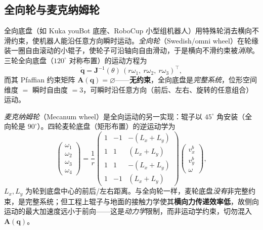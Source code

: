 \subsection{全向轮与麦克纳姆轮}
\label{sec:mw-omni}

全向底盘（如 Kuka youBot 底座、RoboCup 小型组机器人）用特殊轮消去横向不滑约束，使机器人能沿任意方向瞬时运动。\emph{全向轮}（Swedish/omni wheel）在轮缘装一圈自由滚动的小辊子，使轮子可沿轴向自由滑动，于是横向不滑约束被\emph{消除}。三轮全向底盘（$120^\circ$ 对称布置）的运动方程为
\begin{equation}
  \dot{\mathbf{q}}=\mathbf{J}^{-1}(\theta)\,(r\omega_1,\ r\omega_2,\ r\omega_3)^\top,
  \label{eq:mw-omni-fk}
\end{equation}
而其 Pfaffian 约束矩阵 $\mathbf{A}(\mathbf{q})=\varnothing$——\textbf{无约束}，全向底盘是\emph{完整系统}，位形空间维度 $=$ 瞬时自由度 $=3$，可瞬时沿任意方向（前后、左右、旋转的任意组合）运动。

\emph{麦克纳姆轮}（Mecanum wheel）是全向运动的另一实现：辊子以 $45^\circ$ 角安装（全向轮是 $90^\circ$）。四轮麦轮底盘（矩形布置）的逆运动学为
\begin{equation}
  \begin{pmatrix}\omega_1\\\omega_2\\\omega_3\\\omega_4\end{pmatrix}
  =\frac{1}{r}\begin{pmatrix}1&-1&-(L_x+L_y)\\1&1&(L_x+L_y)\\1&1&-(L_x+L_y)\\1&-1&(L_x+L_y)\end{pmatrix}
  \begin{pmatrix}v_x^b\\v_y^b\\\omega\end{pmatrix},
  \label{eq:mw-mecanum}
\end{equation}
$L_x,L_y$ 为轮到底盘中心的前后/左右距离。与全向轮一样，麦轮底盘\emph{没有}非完整约束，是完整系统；但工程上辊子与地面的接触力学使其\textbf{横向力传递效率低}，故侧向运动的最大加速度远小于前向——这是\emph{动力学}限制，而非运动学约束，切勿混入 $\mathbf{A}(\mathbf{q})$。

